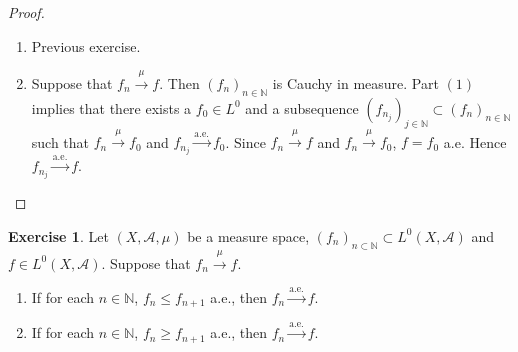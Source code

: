 \documentclass[12pt]{amsart}
\theoremstyle{definition}
\newtheorem{ex}[definition]{Exercise}
\newcommand{\N}{\mathbb{N}}
\newcommand{\MA}{\mathcal{A}}
\newcommand{\convt}[1]{\xrightarrow{\text{#1}}}
\newcommand{\conv}[1]{\xrightarrow{#1}}
\begin{document}
	\begin{proof}\
	\begin{enumerate}
		\item Previous exercise.
		\item Suppose that $f_n \conv{\mu} f$. Then $(f_n)_{n \in \N}$ is Cauchy in measure. Part $(1)$ implies that there exists a $f_0 \in L^0$ and a subsequence $(f_{n_j})_{j \in \N} \subset (f_n)_{n \in \N}$ such that $f_n \conv{\mu} f_0$ and $f_{n_j} \convt{a.e.} f_0$. Since $f_n \conv{\mu} f$ and $f_n \conv{\mu} f_0$, $f = f_0$ a.e. Hence $f_{n_j} \convt{a.e.} f$.
	\end{enumerate}
	\end{proof}

	\begin{ex}
		Let $(X, \MA, \mu)$ be a measure space, $(f_n)_{n \subset \N} \subset L^0(X, \MA)$ and $f \in  L^0(X, \MA)$. Suppose that $f_n \conv{\mu} f$. 
		\begin{enumerate}
			\item If for each $n \in \N$, $f_n \leq f_{n+1}$ a.e., then $f_n \convt{a.e.} f$. 
			\item If for each $n \in \N$, $f_n \geq f_{n+1}$ a.e., then $f_n \convt{a.e.} f$. 
		\end{enumerate}
	\end{ex}
\end{document}
